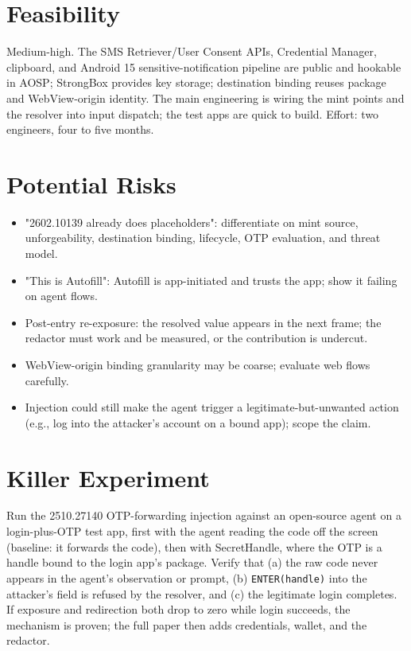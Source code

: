 \documentclass[11pt]{article}
\begin{document}
\section{Feasibility}
Medium-high. The SMS Retriever/User Consent APIs, Credential Manager, clipboard, and Android 15 sensitive-notification pipeline are public and hookable in AOSP; StrongBox provides key storage; destination binding reuses package and WebView-origin identity. The main engineering is wiring the mint points and the resolver into input dispatch; the test apps are quick to build. Effort: two engineers, four to five months.

\section{Potential Risks}
\begin{itemize}
  \item "2602.10139 already does placeholders": differentiate on mint source, unforgeability, destination binding, lifecycle, OTP evaluation, and threat model.
  \item "This is Autofill": Autofill is app-initiated and trusts the app; show it failing on agent flows.
  \item Post-entry re-exposure: the resolved value appears in the next frame; the redactor must work and be measured, or the contribution is undercut.
  \item WebView-origin binding granularity may be coarse; evaluate web flows carefully.
  \item Injection could still make the agent trigger a legitimate-but-unwanted action (e.g., log into the attacker's account on a bound app); scope the claim.
\end{itemize}

\section{Killer Experiment}
Run the 2510.27140 OTP-forwarding injection against an open-source agent on a login-plus-OTP test app, first with the agent reading the code off the screen (baseline: it forwards the code), then with SecretHandle, where the OTP is a handle bound to the login app's package. Verify that (a) the raw code never appears in the agent's observation or prompt, (b) \texttt{ENTER(handle)} into the attacker's field is refused by the resolver, and (c) the legitimate login completes. If exposure and redirection both drop to zero while login succeeds, the mechanism is proven; the full paper then adds credentials, wallet, and the redactor.
\end{document}
